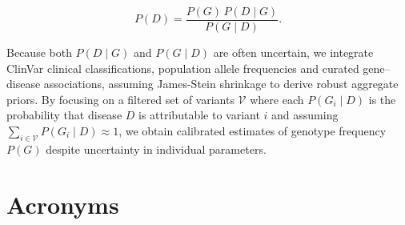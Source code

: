 \[
P(D)=\frac{P(G)\,P(D\mid G)}{P(G\mid D)}.
\]

Because both $P(D\mid G)$ and $P(G\mid D)$ are often uncertain, we integrate ClinVar clinical classifications, population allele frequencies and curated gene–disease associations, assuming James-Stein shrinkage to derive robust aggregate priors. By focusing on a filtered set of variants $\mathcal{V}$ where each $P(G_i\mid D)$ is the probability that disease $D$ is attributable to variant $i$ and assuming $\sum_{i\in\mathcal{V}}P(G_i\mid D)\approx1$, we obtain calibrated estimates of genotype frequency $P(G)$ despite uncertainty in individual parameters. 


\clearpage



\clearpage


\section*{Acronyms}
\renewenvironment{description}%
  {\list{}{\labelwidth0pt\itemindent-\leftmargin
    \parsep-1em\itemsep0pt\let\makelabel\descriptionlabel}}
  {\endlist}
